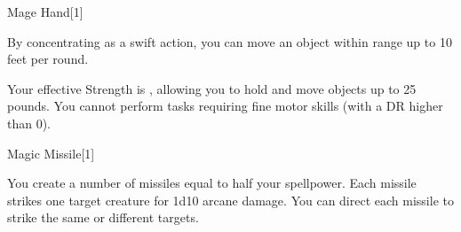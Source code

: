 \begin{spellsection}{Mage Hand}[1]
    \begin{spellheader}
    \end{spellheader}
    \begin{spellcontent}
        \begin{spelltargetinginfo}
            \spellrng{\rngclose}
        \end{spelltargetinginfo}
        \begin{spelleffects}
            \spelleffect By concentrating as a swift action, you can move an object within range up to 10 feet per round.

            Your effective Strength is , allowing you to hold and move objects up to 25 pounds. You cannot perform tasks requiring fine motor skills (with a DR higher than 0).
            \spelldur \durshort
        \end{spelleffects}
    \end{spellcontent}
    \begin{spellfooter}
        \miscastexplode
    \end{spellfooter}
\end{spellsection}

\begin{spellsection}{Magic Missile}[1]
    \begin{spellheader}
    \end{spellheader}
    \begin{spellcontent}
        \begin{spelltargetinginfo}
        \end{spelltargetinginfo}
        \begin{spelleffects}
            \spelleffect You create a number of missiles equal to half your spellpower. Each missile strikes one target creature for 1d10 arcane damage. You can direct each missile to strike the same or different targets.
        \end{spelleffects}
    \end{spellcontent}
    \begin{spellfooter}
        \miscastrandom
    \end{spellfooter}
    \begin{spellaugments}
    \end{spellaugments}
\end{spellsection}

